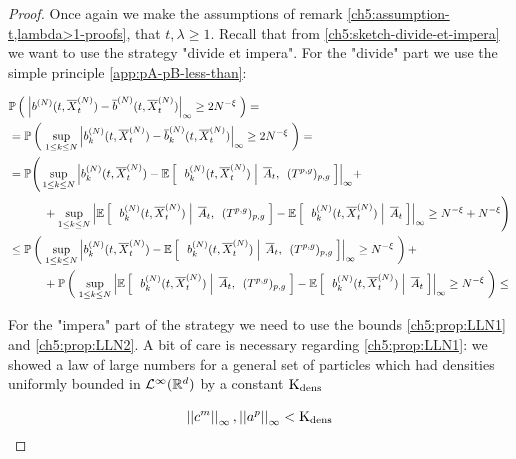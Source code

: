 \begin{proof}
	Once again we make the assumptions of remark \ref{ch5:assumption-t,lambda>1-proofs}, \ie that $t,\lambda\geq1$.
	Recall that from \ref{ch5:sketch-divide-et-impera} we want to use the strategy "divide et impera".
	For the "divide" part we use the simple principle \ref{app:pA-pB-less-than}:
	
	\begin{equation} \label{ch5:lln:divide}
		\begin{aligned}
		&
		\mathbb{P} \left( \; 
			{ \left| 
				b^{(N)}(t, \overline{X}_t^{(N)})
				-
				\overline{b}^{(N)}(t, \overline{X}_t^{(N)})
			 \right|_{\infty} }
			\geq
			2N^{-\xi}
		 \; \right)=
		\\
		&
		= 
		\mathbb{P} \left( \; 
			\sup_{1\leq k \leq N} 
			{ \left| 
				b_k^{(N)}(t, \overline{X}_t^{(N)})
				-
				\overline{b}_k^{(N)}(t, \overline{X}_t^{(N)})
			 \right|_{\infty} }
			\geq
			2N^{-\xi}
		 \; \right)
		=
		\\
		&=
		\mathbb{P} \Bigg(
			\sup_{1\leq k \leq N} 
			{ \left| 
				b_k^{(N)}(t, \overline{X}_t^{(N)})
				-
				\mathbb{E} \left[ \; \left. \; b_k^{(N)}(t, \overline{X}_t^{(N)}) \; \right| \;  \overline{A}_t, \:\;(T^{p,g})_{p,g} \; \right]
			 \right|_{\infty} }
		 +
		\\
		&\qquad\quad
		+
			\sup_{1\leq k \leq N} 
			{ \left| 
				\mathbb{E} \left[ \; \left. \; b_k^{(N)}(t, \overline{X}_t^{(N)}) \; \right| \;  \overline{A}_t, \:\;(T^{p,g})_{p,g} \; \right]
				-
				\mathbb{E} \left[ \; \left. \; b_k^{(N)}(t, \overline{X}_t^{(N)}) \; \right| \;  \overline{A}_t \; \right]
			 \right|_{\infty} }
			\geq
			N^{-\xi} + N^{-\xi}
		\Bigg)
		\\
		&\leq
		\mathbb{P} \left( \; 
			\sup_{1\leq k \leq N} 
			{ \left| 
				b_k^{(N)}(t, \overline{X}_t^{(N)})
				-
				\mathbb{E} \left[ \; \left. \; b_k^{(N)}(t, \overline{X}_t^{(N)}) \; \right| \;  \overline{A}_t, \:\;(T^{p,g})_{p,g} \; \right]
			 \right|_{\infty} }
			\geq
			N^{-\xi}
		 \; \right) +
		\\
		&\qquad\quad
		+
		\mathbb{P} \left( \; 
			\sup_{1\leq k \leq N} 
			{ \left| 
				\mathbb{E} \left[ \; \left. \; b_k^{(N)}(t, \overline{X}_t^{(N)}) \; \right| \;  \overline{A}_t, \:\;(T^{p,g})_{p,g} \; \right]
				-
				\mathbb{E} \left[ \; \left. \; b_k^{(N)}(t, \overline{X}_t^{(N)}) \; \right| \;  \overline{A}_t \; \right]
			 \right|_{\infty} }
			\geq
			N^{-\xi}
		 \; \right)
		\leq
		\end{aligned}
	\end{equation}
	
	For the "impera" part of the strategy we need to use the bounds \ref{ch5:prop:LLN1} and \ref{ch5:prop:LLN2}.
	A bit of care is necessary regarding \ref{ch5:prop:LLN1}: we showed a law of large numbers for a general set of particles which had densities uniformly bounded in $\mathcal{L}^\infty(\mathbb{R}^d)$ by a constant $\text{K}_{\text{dens}}$
	
	\begin{equation*}
		\left|\left| c^m \right|\right|_\infty, \left|\left| a^p \right|\right|_\infty < \text{K}_{\text{dens}}
	\end{equation*}
	

\end{proof}
